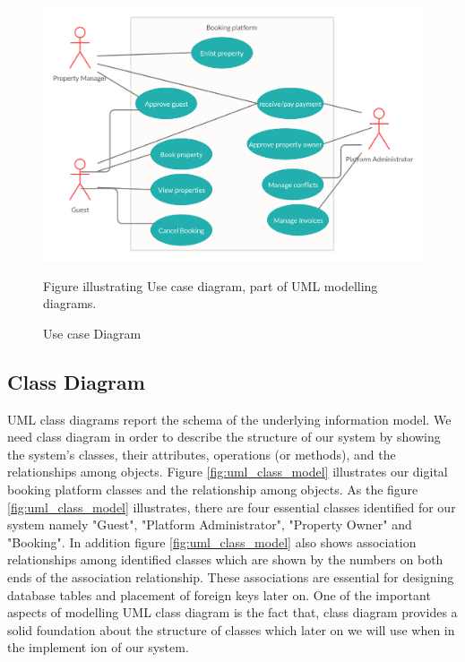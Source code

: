 \begin{figure} 
\centering
\includegraphics[width=12cm]{pictures/UML_usecase_diagram.png}
\caption{Use case Diagram}
Figure illustrating Use case diagram, part of UML modelling diagrams.
\label{fig:uml_usecase_model}
\end{figure}

\subsection{Class Diagram}
UML class diagrams report the schema of the underlying information model. We need class diagram in order to describe the structure of our system by showing the system's classes, their attributes, operations (or methods), and the relationships among objects.
Figure \ref{fig:uml_class_model} illustrates our digital booking platform classes and the relationship among objects. As the figure \ref{fig:uml_class_model} illustrates, there are four essential classes identified for our system namely "Guest", "Platform Administrator", "Property Owner" and "Booking".
In addition figure \ref{fig:uml_class_model} also shows association relationships among identified classes which are shown by the numbers on both ends of the association relationship. These associations are essential for designing database tables and placement of foreign keys later on. 
One of the important aspects of modelling UML class diagram is the fact that, class diagram provides a solid foundation about the structure of classes which later on we will use when in the implement ion of our system.

